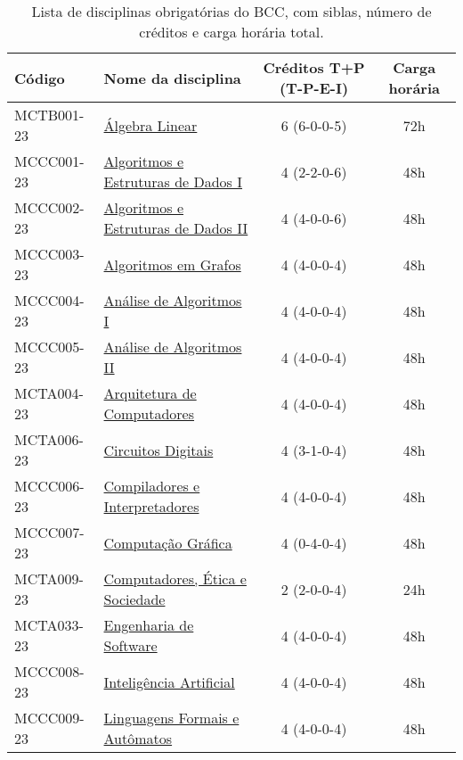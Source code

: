 \begin{table}[h!]
    \caption{Lista de disciplinas obrigatórias do BCC, com siblas, número de créditos e carga horária total.}
    \label{tab:disciplinas_obrigatorias_bcc}

    \centering
    \begin{tabular}{|l|p{}|c|c|}
        \hline
        \textbf{Código} & \textbf{Nome da disciplina} & \textbf{Créditos T+P (T-P-E-I)} & \textbf{Carga horária}\\
        \hline\hline
        MCTB001-23 & \hyperref[disc:alge_lin]{Álgebra Linear} & 6 (6-0-0-5) & 72h \\
        \hline
        MCCC001-23 & \hyperref[disc:aedI]{Algoritmos e Estruturas de Dados I} & 4 (2-2-0-6) & 48h \\
        \hline
        MCCC002-23 & \hyperref[disc:aedII]{Algoritmos e Estruturas de Dados II} & 4 (4-0-0-6) & 48h \\
        \hline
        MCCC003-23 & \hyperref[disc:ag]{Algoritmos em Grafos} & 4 (4-0-0-4) & 48h\\
        \hline
        MCCC004-23 & \hyperref[disc:aaI]{Análise de Algoritmos I} & 4 (4-0-0-4) & 48h \\
        \hline
        MCCC005-23 & \hyperref[disc:aaII]{Análise de Algoritmos II} & 4 (4-0-0-4) & 48h \\
        \hline
        MCTA004-23 & \hyperref[disc:arq]{Arquitetura de Computadores} & 4 (4-0-0-4) & 48h \\
        \hline
        MCTA006-23 & \hyperref[disc:circ_dig]{Circuitos Digitais} & 4 (3-1-0-4) & 48h \\
        \hline
        MCCC006-23 & \hyperref[disc:compi]{Compiladores e Interpretadores} & 4 (4-0-0-4) & 48h \\
        \hline
        MCCC007-23 & \hyperref[disc:cg]{Computação Gráfica} & 4 (0-4-0-4) & 48h  \\
        \hline
        MCTA009-23 & \hyperref[disc:ces]{Computadores, Ética e Sociedade} & 2 (2-0-0-4) & 24h \\
        \hline
        MCTA033-23 & \hyperref[disc:es]{Engenharia de Software} & 4 (4-0-0-4) & 48h \\
        \hline
        MCCC008-23 & \hyperref[disc:ia]{Inteligência Artificial} & 4 (4-0-0-4) & 48h \\
        \hline
        MCCC009-23 & \hyperref[disc:lfa]{Linguagens Formais e Autômatos} & 4 (4-0-0-4) & 48h \\
        \hline

\end{tabular}
\end{table}
